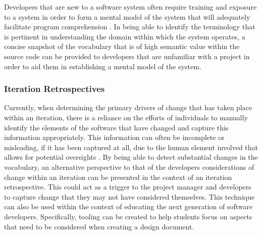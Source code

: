 Developers that are new to a software system often require training and exposure to a system in order to form a mental model of the system that will adequately facilitate program comprehension \cite{Letovsky87a}. In being able to identify the terminology that is pertinent in understanding the domain within which the system operates, a concise snapshot of the vocabulary that is of high semantic value within the source code can be provided to developers that are unfamiliar with a project in order to aid them in establishing a mental model of the system.


\subsubsection{Iteration Retrospectives} %
\label{ssub:iteration_retrospectives}

Currently, when determining the primary drivers of change that has taken place within an iteration, there is a reliance on the efforts of individuals to manually identify the elements of the software that have changed and capture this information appropriately. This information can often be incomplete or misleading, if it has been captured at all, due to the human element involved that allows for potential oversights \cite{Chapin01a}. By being able to detect substantial changes in the vocabulary, an alternative perspective to that of the developers considerations of change within an iteration can be presented in the context of an iteration retrospective. This could act as a trigger to the project manager and developers to capture change that they may not have considered themselves. This technique can also be used within the context of educating the next generation of software developers. Specifically, tooling can be created to help students focus on aspects that need to be considered when creating a design document. 



